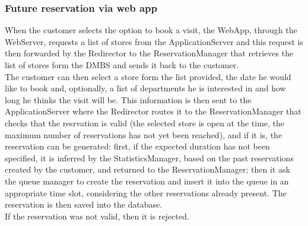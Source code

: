 \subsubsection{Future reservation via web app}
\begin{figure}[H]
	\noindent
\end{figure}
When the customer selects the option to book a visit, the WebApp, through the WebServer, requests a list of stores from the ApplicationServer and this request is then forwarded by the Redirector to the ReservationManager that retrieves the list of stores form the DMBS and sends it back to the customer.\\
The customer can then select a store form the list provided, the date he would like to book and, optionally, a list of departments he is interested in and how long he thinks the visit will be. This information is then sent to the ApplicationServer where the Redirector routes it to the ReservationManager that checks that the resrvation is valid (the selected store is open at the time, the maximum number of reservations has not yet been reached), and if it is, the reservation can be generated: first, if the expected duration has not been specified, it is inferred by the StatisticsManager, based on the past reservations created by the customer, and returned to the ReservationManager; then it ask the queue manager to create the reservation and insert it into the queue in an appropriate time slot, considering the other reservations already present. The reservation is then saved into the database.\\
If the reservation was not valid, then it is rejected.
